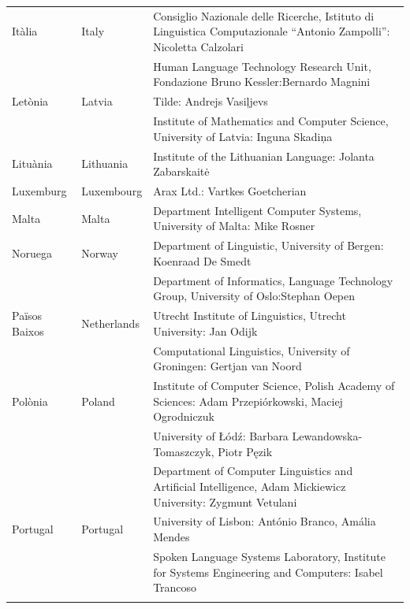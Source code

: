 \begin{longtable}{@{}llp{113mm}@{}}
  Itàlia & \textcolor{grey1}{Italy} & Consiglio Nazionale delle Ricerche, Istituto di Linguistica Computazionale “Antonio Zampolli”: Nicoletta Calzolari\\ \addlinespace
  & & Human Language Technology Research Unit, Fondazione Bruno Kessler:\newline Bernardo Magnini\\ \addlinespace 
  Letònia & \textcolor{grey1}{Latvia} & Tilde: Andrejs Vasiļjevs\\ \addlinespace 
  & & Institute of Mathematics and Computer Science, University of Latvia: Inguna Skadiņa\\ \addlinespace
  Lituània & \textcolor{grey1}{Lithuania} & Institute of the Lithuanian Language: Jolanta Zabarskaitė\\ \addlinespace
  Luxemburg & \textcolor{grey1}{Luxembourg} & Arax Ltd.: Vartkes Goetcherian\\ \addlinespace
  Malta & \textcolor{grey1}{Malta} & Department Intelligent Computer Systems, University of Malta: Mike Rosner\\ \addlinespace
  Noruega & \textcolor{grey1}{Norway} & Department of Linguistic, University of Bergen: Koenraad De Smedt\\ \addlinespace 
  & & Department of Informatics, Language Technology Group, University of Oslo:\newline Stephan Oepen \\ \addlinespace
  Països Baixos & \textcolor{grey1}{Netherlands} & Utrecht Institute of Linguistics, Utrecht University: Jan Odijk\\ \addlinespace 
  & & Computational Linguistics, University of Groningen: Gertjan van Noord\\ \addlinespace
  Polònia & \textcolor{grey1}{Poland} & Institute of Computer Science, Polish Academy of Sciences: Adam Przepiórkowski, Maciej Ogrodniczuk \\ \addlinespace
  & & University of Łódź: Barbara Lewandowska-Tomaszczyk, Piotr Pęzik\\ \addlinespace
  & & Department of Computer Linguistics and Artificial Intelligence, Adam Mickiewicz University: Zygmunt Vetulani \\ \addlinespace
  Portugal & \textcolor{grey1}{Portugal} & University of Lisbon: António Branco, Amália Mendes \\ \addlinespace
  & & Spoken Language Systems Laboratory, Institute for Systems Engineering and Computers: Isabel Trancoso \\ \addlinespace

\end{longtable}
